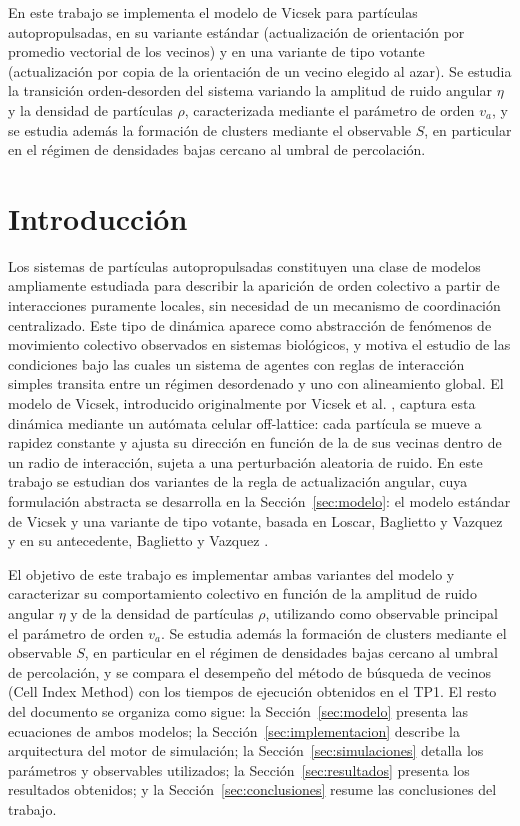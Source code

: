 \documentclass[a4paper,11pt]{article}
\begin{document}
En este trabajo se implementa el modelo de Vicsek para partículas
autopropulsadas, en su variante estándar (actualización de orientación por
promedio vectorial de los vecinos) y en una variante de tipo votante
(actualización por copia de la orientación de un vecino elegido al azar).
Se estudia la transición orden-desorden del sistema variando la amplitud de
ruido angular $\eta$ y la densidad de partículas $\rho$, caracterizada
mediante el parámetro de orden $v_a$, y se estudia además la formación de
clusters mediante el observable $S$, en particular en el régimen de
densidades bajas cercano al umbral de percolación.

\section{Introducción}

Los sistemas de partículas autopropulsadas constituyen una clase de modelos
ampliamente estudiada para describir la aparición de orden colectivo a
partir de interacciones puramente locales, sin necesidad de un mecanismo de
coordinación centralizado. Este tipo de dinámica aparece como abstracción de
fenómenos de movimiento colectivo observados en sistemas biológicos, y
motiva el estudio de las condiciones bajo las cuales un sistema de agentes
con reglas de interacción simples transita entre un régimen desordenado y
uno con alineamiento global. El modelo de Vicsek, introducido originalmente
por Vicsek et al. \cite{ref:vicsek1995}, captura esta dinámica mediante un
autómata celular off-lattice: cada partícula se mueve a rapidez constante y
ajusta su dirección en función de la de sus vecinas dentro de un radio de
interacción, sujeta a una perturbación aleatoria de ruido. En este trabajo
se estudian dos variantes de la regla de actualización angular, cuya
formulación abstracta se desarrolla en la Sección~\ref{sec:modelo}: el
modelo estándar de Vicsek \cite{ref:vicsek1995} y una variante de tipo
votante, basada en Loscar, Baglietto y Vazquez \cite{ref:loscar2021} y en su
antecedente, Baglietto y Vazquez \cite{ref:baglietto2016}.

El objetivo de este trabajo es implementar ambas variantes del modelo y
caracterizar su comportamiento colectivo en función de la amplitud de ruido
angular $\eta$ y de la densidad de partículas $\rho$, utilizando como
observable principal el parámetro de orden $v_a$. Se estudia además la
formación de clusters mediante el observable $S$, en particular en el
régimen de densidades bajas cercano al umbral de percolación, y se compara
el desempeño del método de búsqueda de vecinos (Cell Index Method) con los
tiempos de ejecución obtenidos en el TP1. El resto del documento se organiza
como sigue: la Sección~\ref{sec:modelo} presenta las ecuaciones de ambos
modelos; la Sección~\ref{sec:implementacion} describe la arquitectura del
motor de simulación; la Sección~\ref{sec:simulaciones} detalla los
parámetros y observables utilizados; la Sección~\ref{sec:resultados}
presenta los resultados obtenidos; y la Sección~\ref{sec:conclusiones}
resume las conclusiones del trabajo.
\end{document}
